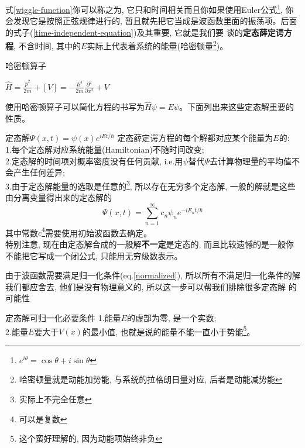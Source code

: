 \documentclass[a4paper,zihao=-4,linespread=1]{ctexrep}
\newenvironment{lequation}{\large\begin{equation}}{\end{equation}}
\begin{document}
    式\ref{wiggle-function}你可以称之为, 它只和时间相关而且你如果使用Euler公式\footnote[1]{$e^{i\theta}=\cos\theta+i\sin\theta$}, 你
    会发现它是按照正弦规律进行的, 暂且就先把它当成是波函数里面的振荡项。后面的式子(\ref{time-independent-equation})及其重要, 它就是我们要
    谈的\textbf{定态薛定谔方程}, 不含时间, 其中的$E$实际上代表着系统的能量(哈密顿量\footnote[2]{哈密顿量就是动能加势能, 与系统的拉格朗日量对应, 后者是动能减势能})。
    \begin{define}{哈密顿算子}
        \begin{center}
           \begin{math}
            \displaystyle
            \hat{H}=\frac{\hat{p}^2}{2m}+[V]=-\frac{\hbar^2}{2m}\frac{\partial^2}{\partial x^2}+V
        \end{math} 
        \end{center}
    \end{define}
    使用哈密顿算子可以简化方程的书写为$\hat{H}\psi=E\psi$。下面列出来这些定态解重要的性质。
    \begin{theorem}{定态解$\Psi(x,t)=\psi(x)e^{iEt/\hbar}$}
        定态薛定谔方程的每个解都对应某个能量为$E$的:\\
        1.每个定态解对应系统能量(Hamiltonian)不随时间改变;\\
        2.定态解的时间项对概率密度没有任何贡献, i.e.用$\psi$替代$\Psi$去计算物理量的平均值不会产生任何差异;\\
        3.由于定态解能量的选取是任意的\footnote{实际上不完全任意}, 所以存在无穷多个定态解, 一般的解就是这些由分离变量得出来的定态解的
        \begin{lequation}
            \boxed{
                \Psi(x,t)=\sum_{n=1}^{\infty}c_n\psi_n e^{-iE_nt/\hbar}
            }
        \end{lequation}
        其中常数$c$\footnote{可以是复数}需要使用初始波函数去确定。\\
        特别注意, 现在由定态解合成的一般解\textbf{不一定}是定态的, 而且比较遗憾的是一般你不能把它写成一个闭公式, 只能用无穷级数表示。
    \end{theorem}
    由于波函数需要满足归一化条件(eq.\ref{normalized}), 所以所有不满足归一化条件的解我们都应舍去, 他们是没有物理意义的, 所以这一步可以帮我们排除很多定态解
    的可能性
    \begin{proposition}{定态解可归一化必要条件}
        1.能量$E$的虚部为零, 是一个实数;\\
        2.能量$E$要大于$V(x)$的最小值, 也就是说的能量不能一直小于势能\footnote{这个蛮好理解的, 因为动能项始终非负}。
    \end{proposition}
\end{document}
